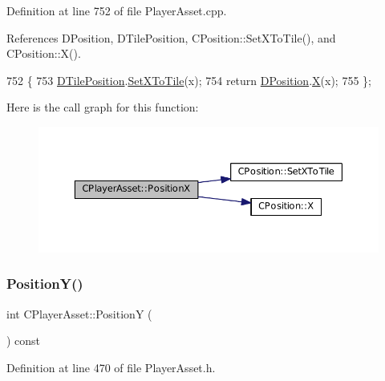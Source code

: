 Definition at line 752 of file Player\+Asset.\+cpp.



References D\+Position, D\+Tile\+Position, C\+Position\+::\+Set\+X\+To\+Tile(), and C\+Position\+::\+X().


\begin{DoxyCode}
752                                 \{
753     \hyperlink{classCPlayerAsset_a5b59a9d3b7db8c7fa194b80dafb96186}{DTilePosition}.\hyperlink{classCPosition_a12795d06d34e608697b7b4c9bf202a10}{SetXToTile}(x);
754     \textcolor{keywordflow}{return} \hyperlink{classCPlayerAsset_aa9f53c009b181c7c5647c6b03776a04c}{DPosition}.\hyperlink{classCPosition_a9a6b94d3b91df1492d166d9964c865fc}{X}(x);
755 \};
\end{DoxyCode}
Here is the call graph for this function\+:\nopagebreak
\begin{figure}[H]
\begin{center}
\leavevmode
\includegraphics[width=350pt]{classCPlayerAsset_a3b0981638b2e86e1ffb211365db26b41_cgraph}
\end{center}
\end{figure}
\hypertarget{classCPlayerAsset_a4f70846298e9951489ef138847c268a5}{}\label{classCPlayerAsset_a4f70846298e9951489ef138847c268a5} 
\subsubsection{\texorpdfstring{Position\+Y()}{PositionY()}\hspace{0.1cm}{\footnotesize\ttfamily [1/2]}}
{\footnotesize\ttfamily int C\+Player\+Asset\+::\+PositionY (\begin{DoxyParamCaption}{ }\end{DoxyParamCaption}) const\hspace{0.3cm}{\ttfamily [inline]}}



Definition at line 470 of file Player\+Asset.\+h.



